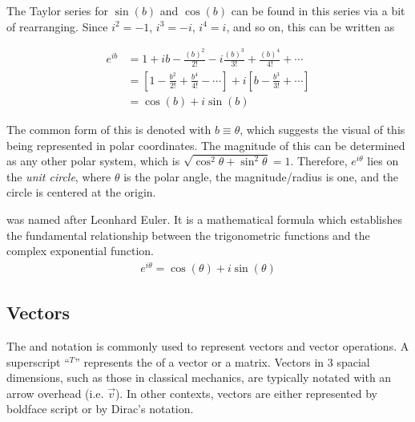 The Taylor series for $\sin(b)$ and $\cos(b)$ can be found in this series via a bit of rearranging. Since $i^2=-1$, $i^3 = -i$, $i^4=i$, and so on, this can be written as

\begin{align}
	e^{ib} &= 1 +ib - \frac{(b)^2}{2!} - i\frac{(b)^3}{3!} + \frac{(b)^4}{4!} + \cdots \\
	       &= \left[1 - \frac{b^2}{2!} + \frac{b^4}{4!}  - \cdots\right] + i\left[b- \frac{b^3}{3!}  + \cdots \right] \\
	       &= \cos(b) + i\sin(b)
\end{align}

The common form of this is denoted with $b \equiv \theta$, which suggests the visual of this being represented in polar coordinates. The magnitude of this can be determined as any other polar system, which is $\sqrt{\cos^2\theta + \sin^2\theta}=1$. Therefore, $e^{i\theta}$ lies on the \textit{unit circle}, where $\theta$ is the polar angle, the magnitude/radius is one, and the circle is centered at the origin.

\begin{defn}{1}
 was named after Leonhard Euler. It is a mathematical formula which establishes the fundamental relationship between the trigonometric functions and the complex exponential function.
\begin{align}
	e^{i\theta} = \cos(\theta) + i\sin(\theta)
\end{align}
\end{defn}


\subsection{Vectors}

The  and  notation is commonly used to represent vectors and vector operations. A superscript ``$^T$'' represents the  of a vector or a matrix. Vectors in 3 spacial dimensions, such as those in classical mechanics, are typically notated with an arrow overhead (i.e. $\vec{v}$). In other contexts, vectors are either represented by boldface script or by Dirac's  notation. 

